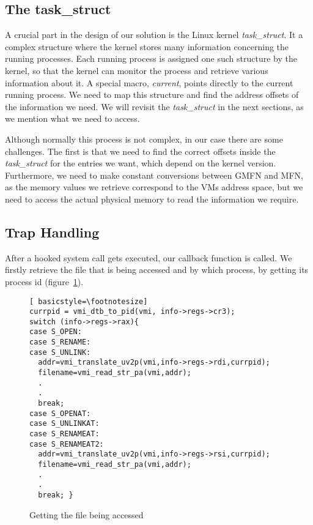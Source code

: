 \subsection{The task\_struct}\label{sub:struct}
A crucial part in the design of our solution is the Linux kernel \textit{task\_struct}. It a complex structure where the kernel stores many information concerning the running processes. Each running process is assigned one such structure by the kernel, so that the kernel can monitor the process and retrieve various information about it. A special macro, \textit{current}, points directly to the current running process. We need to map this structure and find the address offsets of the information we need. We will revisit the \textit{task\_struct} in the next sections, as we mention what we need to access.
\par Although normally this process is not complex, in our case there are some challenges. The first is that we need to find the correct offsets inside the \textit{task\_struct} for the entries we want, which depend on the kernel version. Furthermore, we need to make constant conversions between \ac{GMFN} and \ac{MFN}, as the memory values we retrieve correspond to the \ac{VM}s address space, but we need to access the actual physical memory to read the information we require.

\subsection{Trap Handling}\label{sub:handling}

After a hooked system call gets executed, our callback function is called. We firstly retrieve the file that is being accessed and by which process, by getting its process id (figure~\ref{fig:getfile}). 

\begin{figure}[ht]
\centering
\begin{lstlisting}[ basicstyle=\footnotesize]
currpid = vmi_dtb_to_pid(vmi, info->regs->cr3);
switch (info->regs->rax){
case S_OPEN:
case S_RENAME:
case S_UNLINK:
  addr=vmi_translate_uv2p(vmi,info->regs->rdi,currpid);
  filename=vmi_read_str_pa(vmi,addr);
  .
  .
  break;
case S_OPENAT:
case S_UNLINKAT:
case S_RENAMEAT:
case S_RENAMEAT2:
  addr=vmi_translate_uv2p(vmi,info->regs->rsi,currpid);
  filename=vmi_read_str_pa(vmi,addr);
  .
  .
  break; }
\end{lstlisting}
\caption{Getting the file being accessed}
\label{fig:getfile}
\end{figure}


